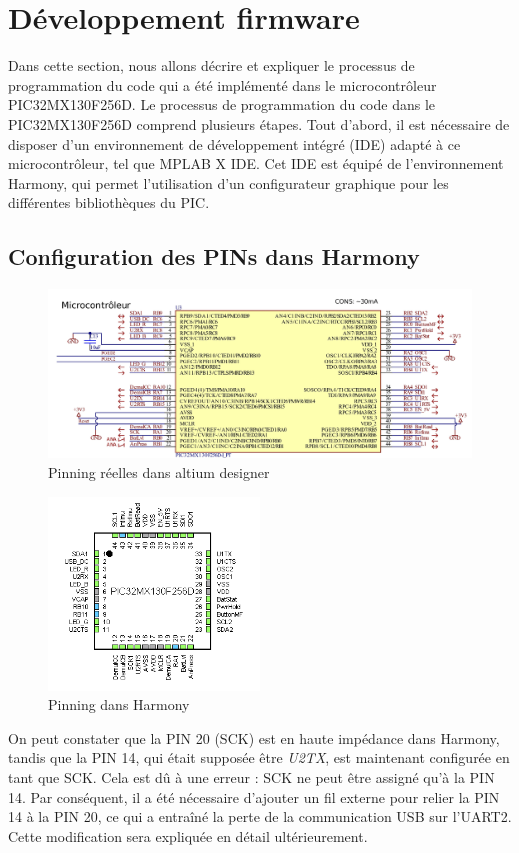 \section{Développement firmware}
Dans cette section, nous allons décrire et expliquer le processus de programmation du code qui a été implémenté dans le microcontrôleur PIC32MX130F256D.
Le processus de programmation du code dans le PIC32MX130F256D comprend plusieurs étapes. Tout d'abord, il est nécessaire de disposer d'un environnement de développement intégré (IDE) adapté à ce microcontrôleur, tel que MPLAB X IDE. Cet IDE est équipé de l'environnement Harmony, qui permet l'utilisation d'un configurateur graphique pour les différentes bibliothèques du PIC.

\subsection{Configuration des PINs dans Harmony}
{
	\begin{figure}[h]
		\centering
		\includegraphics[width=.9\textwidth]{Figures/Dev-SOFT/MCU-Altium}
		\caption{Pinning réelles dans altium designer}
		\label{fig:mcu-altium}
	\end{figure}
	\begin{figure}[h]
		\centering
		\includegraphics[width=0.5\textwidth]{Figures/Dev-SOFT/MCU-Harmony}
		\caption{Pinning dans Harmony}
		\label{fig:mcu-harmony}
	\end{figure}
	
	On peut constater que la PIN 20 (SCK) est en haute impédance dans Harmony, tandis que la PIN 14, qui était supposée être \textit{U2TX}, est maintenant configurée en tant que SCK. Cela est dû à une erreur : SCK ne peut être assigné qu'à la PIN 14. Par conséquent, il a été nécessaire d'ajouter un fil externe pour relier la PIN 14 à la PIN 20, ce qui a entraîné la perte de la communication USB sur l'UART2. Cette modification sera expliquée en détail ultérieurement.
	
	
}

